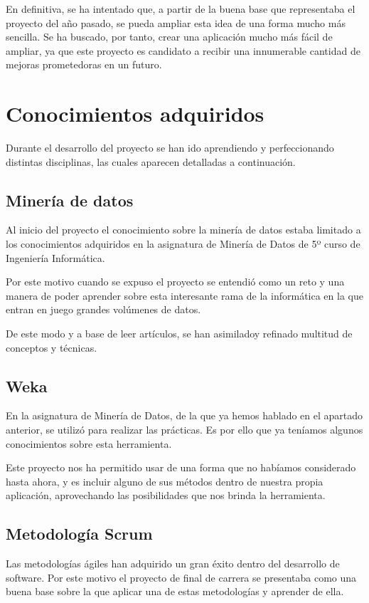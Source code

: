 En definitiva, se ha intentado que, a partir de la buena base que representaba el proyecto del año pasado, se pueda ampliar esta idea de una forma mucho más sencilla. Se ha buscado, por tanto, crear una aplicación mucho más fácil de ampliar, ya que este proyecto es candidato a recibir una innumerable cantidad de mejoras prometedoras en un futuro.


\section{Conocimientos adquiridos}
Durante el desarrollo del proyecto se han ido aprendiendo y perfeccionando distintas disciplinas, las cuales aparecen detalladas a continuación.

\subsection{Minería de datos}
Al inicio del proyecto el conocimiento sobre la minería de datos estaba limitado a los conocimientos adquiridos en la asignatura de Minería de Datos de 5º curso de Ingeniería Informática.

Por este motivo cuando se expuso el proyecto se entendió como un reto y una manera de poder aprender sobre esta interesante rama de la informática en la que entran en juego grandes volúmenes de datos.

De este modo y a base de leer artículos, se han asimiladoy refinado multitud de conceptos y técnicas.

\subsection{Weka}
En la asignatura de Minería de Datos, de la que ya hemos hablado en el apartado anterior, se utilizó \weka{} para realizar las prácticas. Es por ello que ya teníamos algunos conocimientos sobre esta herramienta.

Este proyecto nos ha permitido usar \weka{} de una forma que no habíamos considerado hasta ahora, y es incluir alguno de sus métodos dentro de nuestra propia aplicación, aprovechando las posibilidades que nos brinda la herramienta.

\subsection{Metodología Scrum}
Las metodologías ágiles han adquirido un gran éxito dentro del desarrollo de software. Por este motivo el proyecto de final de carrera se presentaba como una buena base sobre la que aplicar una de estas metodologías y aprender de ella.

